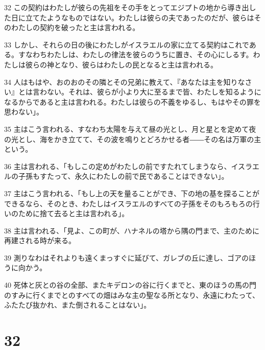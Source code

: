 \par 32 この契約はわたしが彼らの先祖をその手をとってエジプトの地から導き出した日に立てたようなものではない。わたしは彼らの夫であったのだが、彼らはそのわたしの契約を破ったと主は言われる。
\par 33 しかし、それらの日の後にわたしがイスラエルの家に立てる契約はこれである。すなわちわたしは、わたしの律法を彼らのうちに置き、その心にしるす。わたしは彼らの神となり、彼らはわたしの民となると主は言われる。
\par 34 人はもはや、おのおのその隣とその兄弟に教えて、『あなたは主を知りなさい』とは言わない。それは、彼らが小より大に至るまで皆、わたしを知るようになるからであると主は言われる。わたしは彼らの不義をゆるし、もはやその罪を思わない」。
\par 35 主はこう言われる、すなわち太陽を与えて昼の光とし、月と星とを定めて夜の光とし、海をかき立てて、その波を鳴りとどろかせる者――その名は万軍の主という。
\par 36 主は言われる、「もしこの定めがわたしの前ですたれてしまうなら、イスラエルの子孫もすたって、永久にわたしの前で民であることはできない」。
\par 37 主はこう言われる、「もし上の天を量ることができ、下の地の基を探ることができるなら、そのとき、わたしはイスラエルのすべての子孫をそのもろもろの行いのために捨て去ると主は言われる」。
\par 38 主は言われる、「見よ、この町が、ハナネルの塔から隅の門まで、主のために再建される時が来る。
\par 39 測りなわはそれよりも遠くまっすぐに延びて、ガレブの丘に達し、ゴアのほうに向かう。
\par 40 死体と灰との谷の全部、またキデロンの谷に行くまでと、東のほうの馬の門のすみに行くまでとのすべての畑はみな主の聖なる所となり、永遠にわたって、ふたたび抜かれ、また倒されることはない」。

\chapter{32}

